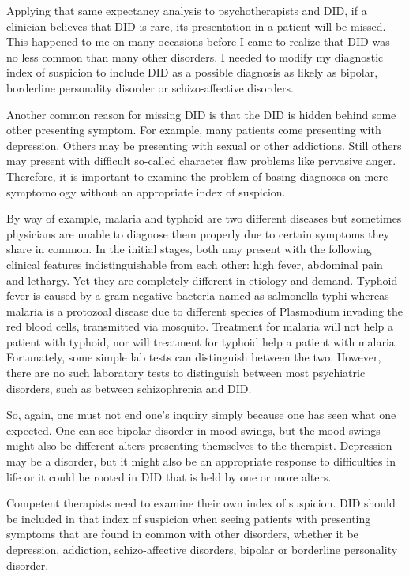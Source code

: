 \documentclass[]{book}
\begin{document}
Applying that same expectancy analysis to psychotherapists and DID, if a clinician believes that DID is rare, its presentation in a patient will be missed. This happened to me on many occasions before I came to realize that DID was no less common than many other disorders. I needed to modify my diagnostic index of suspicion to include DID as a possible diagnosis as likely as bipolar, borderline personality disorder or schizo-affective disorders.

Another common reason for missing DID is that the DID is hidden behind some other presenting symptom. For example, many patients come presenting with depression. Others may be presenting with sexual or other addictions. Still others may present with difficult so-called character flaw problems like pervasive anger. Therefore, it is important to examine the problem of basing diagnoses on mere symptomology without an appropriate index of suspicion.

By way of example, malaria and typhoid are two different diseases but sometimes physicians are unable to diagnose them properly due to certain symptoms they share in common. In the initial stages, both may present with the following clinical features indistinguishable from each other: high fever, abdominal pain and lethargy. Yet they are completely different in etiology and demand. Typhoid fever is caused by a gram negative bacteria named as salmonella typhi whereas malaria is a protozoal disease due to different species of Plasmodium invading the red blood cells, transmitted via mosquito. Treatment for malaria will not help a patient with typhoid, nor will treatment for typhoid help a patient with malaria. Fortunately, some simple lab tests can distinguish between the two. However, there are no such laboratory tests to distinguish between most psychiatric disorders, such as between schizophrenia and DID.

So, again, one must not end one's inquiry simply because one has seen what one expected. One can see bipolar disorder in mood swings, but the mood swings might also be different alters presenting themselves to the therapist. Depression may be a disorder, but it might also be an appropriate response to difficulties in life or it could be rooted in DID that is held by one or more alters.

Competent therapists need to examine their own index of suspicion. DID should be included in that index of suspicion when seeing patients with presenting symptoms that are found in common with other disorders, whether it be depression, addiction, schizo-affective disorders, bipolar or borderline personality disorder.
\end{document}
